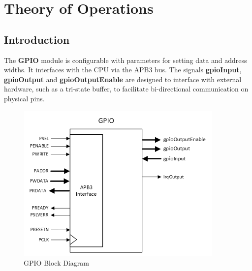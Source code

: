 \section{Theory of Operations}

\subsection{Introduction}
The \textbf{GPIO} module is configurable with parameters for setting data and address widths. It interfaces with the CPU via the APB3 bus. The signals \textbf{gpioInput}, \textbf{gpioOutput} and \textbf{gpioOutputEnable} are designed to interface with external hardware, such as a tri-state buffer, to facilitate bi-directional communication on physical pins.

\begin{figure}[h]
  \includegraphics[width=0.90\textwidth]{images/block-diagram-gpio.png}
  \caption{GPIO Block Diagram}\label{fig:block-diagram}
\end{figure}




